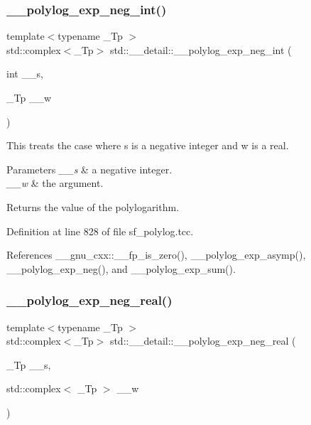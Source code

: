 \subsubsection{\texorpdfstring{\+\_\+\+\_\+polylog\+\_\+exp\+\_\+neg\+\_\+int()}{\_\_polylog\_exp\_neg\_int()}\hspace{0.1cm}{\footnotesize\ttfamily [2/2]}}
{\footnotesize\ttfamily template$<$typename \+\_\+\+Tp $>$ \\
std\+::complex$<$\+\_\+\+Tp$>$ std\+::\+\_\+\+\_\+detail\+::\+\_\+\+\_\+polylog\+\_\+exp\+\_\+neg\+\_\+int (\begin{DoxyParamCaption}\item[{int}]{\+\_\+\+\_\+s,  }\item[{\+\_\+\+Tp}]{\+\_\+\+\_\+w }\end{DoxyParamCaption})}

This treats the case where s is a negative integer and w is a real.


\begin{DoxyParams}{Parameters}
{\em \+\_\+\+\_\+s} & a negative integer. \\
\hline
{\em \+\_\+\+\_\+w} & the argument. \\
\hline
\end{DoxyParams}
\begin{DoxyReturn}{Returns}
the value of the polylogarithm. 
\end{DoxyReturn}


Definition at line 828 of file sf\+\_\+polylog.\+tcc.



References \+\_\+\+\_\+gnu\+\_\+cxx\+::\+\_\+\+\_\+fp\+\_\+is\+\_\+zero(), \+\_\+\+\_\+polylog\+\_\+exp\+\_\+asymp(), \+\_\+\+\_\+polylog\+\_\+exp\+\_\+neg(), and \+\_\+\+\_\+polylog\+\_\+exp\+\_\+sum().

\mbox{\label{namespacestd_1_1____detail_a6320926219e1a9a653d9a793c7a3ad37}} 
\subsubsection{\texorpdfstring{\+\_\+\+\_\+polylog\+\_\+exp\+\_\+neg\+\_\+real()}{\_\_polylog\_exp\_neg\_real()}\hspace{0.1cm}{\footnotesize\ttfamily [1/2]}}
{\footnotesize\ttfamily template$<$typename \+\_\+\+Tp $>$ \\
std\+::complex$<$\+\_\+\+Tp$>$ std\+::\+\_\+\+\_\+detail\+::\+\_\+\+\_\+polylog\+\_\+exp\+\_\+neg\+\_\+real (\begin{DoxyParamCaption}\item[{\+\_\+\+Tp}]{\+\_\+\+\_\+s,  }\item[{std\+::complex$<$ \+\_\+\+Tp $>$}]{\+\_\+\+\_\+w }\end{DoxyParamCaption})}

